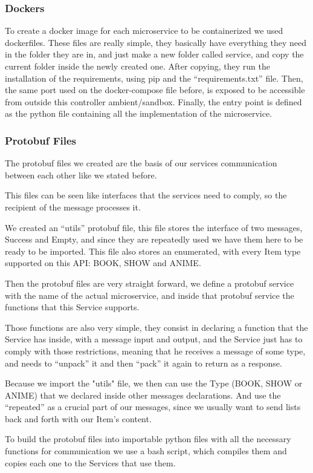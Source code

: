 \documentclass[oneside]{article}
\newcommand*\fpar{\hspace{1ex}}
\begin{document}
    \subsubsection{Dockers}
    \fpar To create a docker image for each microservice to be containerized we used dockerfiles. These files are really simple, they basically have everything they need in the folder they are in, and just make a new folder called service, and copy the current folder inside the newly created one. After copying, they run the installation of the requirements, using pip and the “requirements.txt” file. Then, the same port used on the docker-compose file before, is exposed to be accessible from outside this controller ambient/sandbox. Finally, the entry point is defined as the python file containing all the implementation of the microservice.

    \subsubsection{Protobuf Files}
    \fpar The protobuf files we created are the basis of our services communication between each other like we stated before.
    \par This files can be seen like interfaces that the services need to comply, so the recipient of the message processes it.
    \par We created an “utils” protobuf file, this file stores the interface of two messages, Success and Empty, and since they are repeatedly used we have them here to be ready to be imported. This file also stores an enumerated, with every Item type supported on this API: BOOK, SHOW and ANIME.
    \par Then the protobuf files are very straight forward, we define a protobuf service with the name of the actual microservice, and inside that protobuf service the functions that this Service supports.
    \par Those functions are also very simple, they consist in declaring a function that the Service has inside, with a message input and output, and the Service just has to comply with those restrictions, meaning that he receives a message of some type, and needs to “unpack” it and then “pack” it again to return as a response.
    \par Because we import the "utils" file, we then can use the Type (BOOK, SHOW or ANIME) that we declared inside other messages declarations. And use the “repeated” as a crucial part of our messages, since we usually want to send lists back and forth with our Item's content.
    \par To build the protobuf files into importable python files with all the necessary functions for communication we use a bash script, which compiles them and copies each one to the Services that use them.
      
\end{document}
